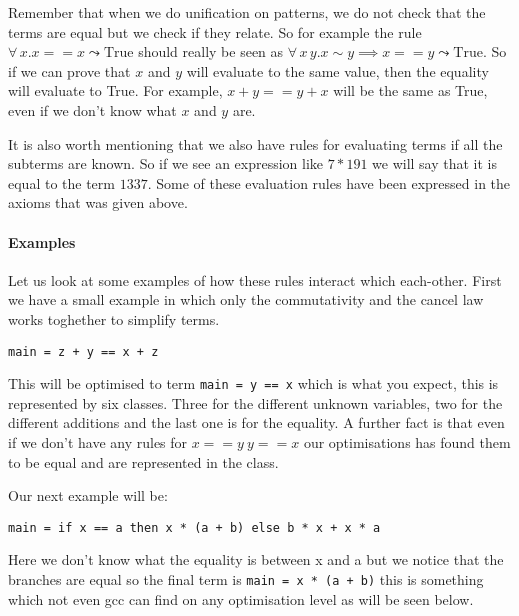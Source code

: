 Remember that when we do unification on patterns, we do not check that the terms
are equal but we check if they relate. So for example the rule $\forall \, x. x == x \leadsto \text{True}$
should really be seen as $\forall \, x \, y. x \sim y \implies x == y \leadsto \text{True}$.
So if we can prove that $x$ and $y$ will evaluate to the same value, then the equality
will evaluate to True. For example, $x + y == y + x$ will be the same as True, even
if we don't know what $x$ and $y$ are.

It is also worth mentioning that we also have rules for evaluating terms if all
the subterms are known. So if we see an expression like $7 * 191$ we will say that
it is equal to the term $1337$. Some of these evaluation rules have been expressed
in the axioms that was given above.

\paragraph{Examples}

Let us look at some examples of how these rules interact which each-other. First
we have a small example in which only the commutativity and the cancel law works
toghether to simplify terms.

\begin{verbatim}
main = z + y == x + z
\end{verbatim}

This will be optimised to term \verb|main = y == x| which is what you expect, this
is represented by six classes. Three for the different unknown variables, two
for the different additions and the last one is for the equality. A further fact
is that even if we don't have any rules for $ x == y ~ y == x$ our optimisations
has found them to be equal and are represented in the class.

Our next example will be:

\begin{verbatim}
main = if x == a then x * (a + b) else b * x + x * a
\end{verbatim}

Here we don't know what the equality is between x and a but we notice that the branches
are equal so the final term is \verb"main = x * (a + b)" this is something which
not even gcc can find on any optimisation level as will be seen below.

